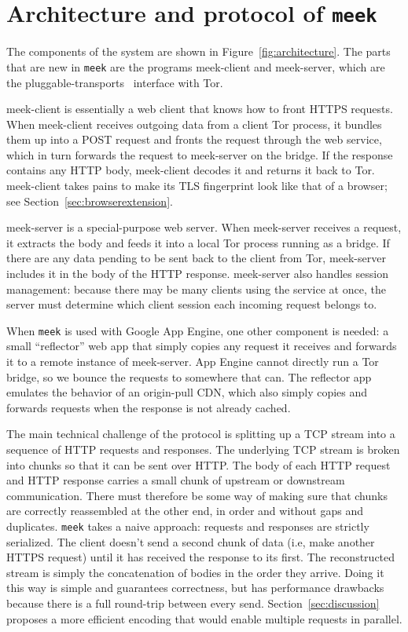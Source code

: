 \documentclass[conference]{IEEEtran}
\newcommand{\meekclient}{\mbox{meek-client}\xspace}
\newcommand{\meekserver}{\mbox{meek-server}\xspace}
\newcommand{\meek}{\texttt{meek}\xspace}
\begin{document}
\section{Architecture and protocol of \meek}
\label{sec:architecture}

The components of the system are shown in Figure~\ref{fig:architecture}.
The parts that are new in \meek
are the programs \meekclient and \meekserver,
which are the pluggable-transports~\cite{pt} interface with Tor.

\meekclient is essentially a web client that knows how to front HTTPS requests.
When \meekclient receives outgoing data from a client Tor process, it bundles them up into a POST request
and fronts the request through the web service,
which in turn forwards the request to \meekserver on the bridge.
If the response contains any HTTP body, \meekclient decodes it and returns it back to Tor.
\meekclient takes pains to make its TLS fingerprint
look like that of a browser; see Section~\ref{sec:browserextension}.

\meekserver is a special-purpose web server.
When \meekserver receives a request, it extracts the body and feeds it into
a local Tor process running as a bridge.
If there are any data pending to be sent back to the client from Tor,
\meekserver includes it in the body of the HTTP response.
\meekserver also handles session management:
because there may be many clients using the service at once,
the server must determine which client session each incoming request belongs to.

When \meek is used with Google App Engine, one other component is needed:
a small ``reflector'' web app that simply copies any request
it receives and forwards it to a remote instance of \meekserver.
App Engine cannot directly run a Tor bridge,
so we bounce the requests to somewhere that can.
The reflector app emulates the behavior of an origin-pull CDN,
which also simply copies and forwards requests
when the response is not already cached.

The main technical challenge of the protocol is splitting up a TCP stream
into a sequence of HTTP requests and responses.
The underlying TCP stream is broken into chunks so that
it can be sent over HTTP.
The body of each HTTP request and HTTP response carries
a small chunk of upstream or downstream communication.
There must therefore be some way of making sure that chunks
are correctly reassembled at the other end,
in order and without gaps and duplicates.
\meek takes a naive approach: requests and responses are strictly serialized.
The client doesn't send a second chunk of data
(i.e, make another HTTPS request) until it has
received the response to its first.
The reconstructed stream is simply the concatenation
of bodies in the order they arrive.
Doing it this way is simple and guarantees correctness,
but has performance drawbacks because there is a full round-trip
between every send.
Section~\ref{sec:discussion} proposes a more efficient encoding
that would enable multiple requests in parallel.
\end{document}
